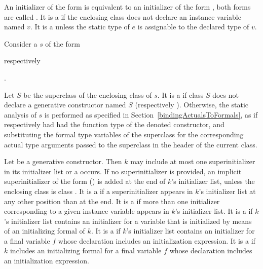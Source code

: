 \documentclass[makeidx]{article}
\begin{document}
\LMHash{}%
An initializer of the form  is equivalent to
an initializer of the form ,
both forms are called .
It is a  if the enclosing class
does not declare an instance variable named $v$.
It is a  unless the static type of $e$
is assignable to the declared type of $v$.

\LMHash{}%
Consider a  $s$ of the form

\noindent
{}
respectively

\noindent
{}.

\noindent{}%
Let $S$ be the superclass of the enclosing class of $s$.
It is a  if class $S$ does not declare
a generative constructor named $S$ (respectively ).
Otherwise, the static analysis of $s$ is performed
as specified in Section~\ref{bindingActualsToFormals},
as if \code{\SUPER} respectively 
had had the function type of the denoted constructor,
and substituting the formal type variables of the superclass
for the corresponding actual type arguments passed to the superclass
in the header of the current class.

\LMHash{}%
Let  be a generative constructor.
Then $k$ may include at most one superinitializer in its initializer list
or a  occurs.
If no superinitializer is provided,
an implicit superinitializer of the form \SUPER{}() is added
at the end of $k$'s initializer list,
unless the enclosing class is class .
It is a  if a superinitializer appears
in $k$'s initializer list at any other position than at the end.
It is a  if more than one initializer corresponding
to a given instance variable appears in $k$'s initializer list.
It is a  if $k$'s initializer list contains
an initializer for a variable that is initialized by means of
an initializing formal of $k$.
It is a  if $k$'s initializer list contains
an initializer for a final variable $f$ whose declaration includes
an initialization expression.
It is a  if $k$ includes an initializing formal
for a final variable $f$ whose declaration includes
an initialization expression.
\end{document}
